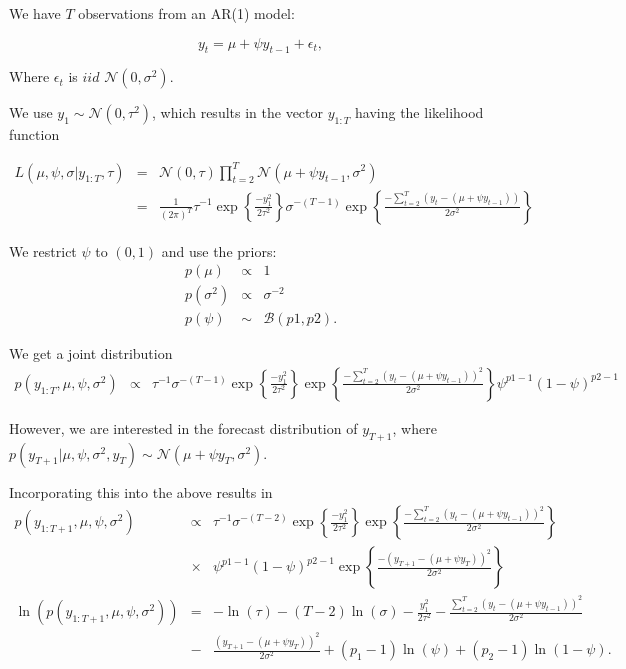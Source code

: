 \documentclass{article}
\begin{document}


We have $T$ observations from an AR(1) model:

$$y_{t} = \mu + \psi y_{t-1}+ \epsilon_{t},$$

Where $\epsilon_{t}$ is $iid \hspace{4pt} \mathcal{N}(0,\sigma^2).$

We use $y_1 \sim \mathcal{N}(0, \tau^2)$, which results in the vector $y_{1:T}$ having the likelihood function

\begin{eqnarray*}
\label{likelihood}
L(\mu, \psi, \sigma | y_{1:T}, \tau) & = & \mathcal{N}(0, \tau) \prod_{t=2}^{T} \mathcal{N}(\mu + \psi y_{t-1}, \sigma^2) \nonumber \\
& = & \frac{1}{(2\pi)^T} \tau^{-1} \exp \left\{ \frac{-y_1^2}{2\tau^2}\right\} \sigma^{-(T-1)} \exp \left\{ \frac{-\sum^{T}_{t=2}(y_t-(\mu+\psi y_{t-1}))}{2\sigma^2}\right\}  
\end{eqnarray*}

We restrict $\psi$ to $(0, 1)$ and use the priors:
\begin{eqnarray*}
\label{priors}
p(\mu) & \propto & 1 \\
p(\sigma^2) & \propto & \sigma^{-2} \\
p(\psi) & \sim & \mathcal{B}(p1, p2).
\end{eqnarray*}



We get a joint distribution
\begin{eqnarray*}
\label{joint}
p(y_{1:T}, \mu, \psi, \sigma^2) & \propto &  \tau^{-1} \sigma^{-(T-1)}  \exp \left\{ \frac{-y_1^2}{2\tau^2}\right\} \exp \left\{ \frac{-\sum^{T}_{t=2}(y_t-(\mu+\psi y_{t-1}))^2}{2\sigma^2}\right\} \psi^{p1-1}(1-\psi)^{p2-1}
\end{eqnarray*}

However, we are interested in the forecast distribution of $y_{T+1}$, where $p(y_{T+1} | \mu, \psi, \sigma^2, y_T) \sim \mathcal{N}(\mu + \psi y_T, \sigma^2).$

Incorporating this into the above results in
\begin{eqnarray*}
\label{jointpred}
p(y_{1:T+1}, \mu, \psi, \sigma^2) & \propto &  \tau^{-1} \sigma^{-(T-2)}  \exp \left\{ \frac{-y_1^2}{2\tau^2}\right\} \exp \left\{ \frac{-\sum^{T}_{t=2}(y_t-(\mu+\psi y_{t-1}))^2}{2\sigma^2}\right\} \\
& \times &  \psi^{p1-1}(1-\psi)^{p2-1} \exp \left\{ \frac{-(y_{T+1}-(\mu+\psi y_T))^2}{2\sigma^2} \right\} \\
\ln(p(y_{1:T+1}, \mu, \psi, \sigma^2)) & = & -\ln(\tau) - (T-2) \ln(\sigma) - \frac{y_1^2}{2\tau^2} - \frac{\sum^{T}_{t=2}(y_t-(\mu+\psi y_{t-1}))^2}{2\sigma^2} \\
& - &  \frac{(y_{T+1}-(\mu+\psi y_T))^2}{2\sigma^2} + (p_1-1) \ln(\psi) + (p_2-1)\ln(1-\psi).
\end{eqnarray*}
\end{document}
